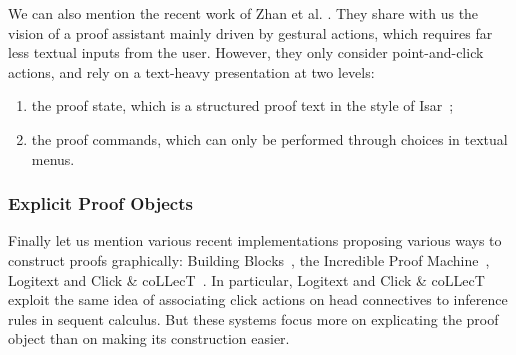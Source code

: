 We can also mention the recent work of Zhan et
al. \cite{zhan-design-2019}. They share with us the vision of a proof assistant
mainly driven by gestural actions, which requires far less textual inputs from
the user. However, they only consider point-and-click actions, and rely on a
text-heavy presentation at two levels:
\begin{enumerate}
  \item the proof state, which is a structured proof text in the style of Isar~\cite{isar};
  \item the proof commands, which can only be performed through choices in textual menus.
\end{enumerate}



\subsubsection*{Explicit Proof Objects}

Finally let us mention various recent implementations proposing various ways to
construct proofs graphically: Building Blocks~\cite{buildingblocks}, the
Incredible Proof Machine~\cite{blanchette-visual-2016},
Logitext and Click \&
coLLecT~\cite{clickcollect}. In particular, Logitext and Click \& coLLecT
exploit the same idea of associating click actions on head connectives to
inference rules in sequent calculus. But these systems focus more on explicating
the proof object than on making its construction easier.


